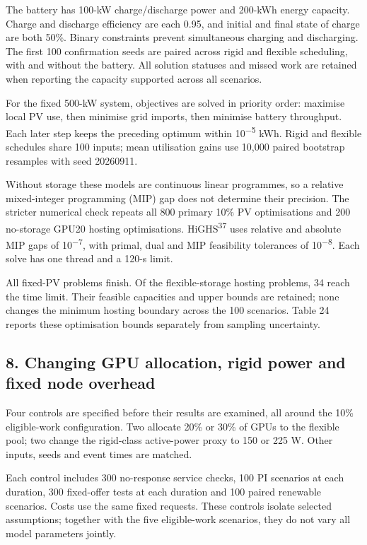 \documentclass[10pt,a4paper]{article}
\begin{document}
The battery has 100-kW charge/discharge power and 200-kWh energy capacity. Charge and discharge efficiency are each 0.95, and initial and final state of charge are both 50\%. Binary constraints prevent simultaneous charging and discharging. The first 100 confirmation seeds are paired across rigid and flexible scheduling, with and without the battery. All solution statuses and missed work are retained when reporting the capacity supported across all scenarios.


For the fixed 500-kW system, objectives are solved in priority order: maximise local PV use, then minimise grid imports, then minimise battery throughput. Each later step keeps the preceding optimum within 10\textsuperscript{−5} kWh. Rigid and flexible schedules share 100 inputs; mean utilisation gains use 10,000 paired bootstrap resamples with seed 20260911.


Without storage these models are continuous linear programmes, so a relative mixed-integer programming (MIP) gap does not determine their precision. The stricter numerical check repeats all 800 primary 10\% PV optimisations and 200 no-storage GPU20 hosting optimisations. HiGHS\textsuperscript{37} uses relative and absolute MIP gaps of 10\textsuperscript{−7}, with primal, dual and MIP feasibility tolerances of 10\textsuperscript{−8}. Each solve has one thread and a 120-s limit.


All fixed-PV problems finish. Of the flexible-storage hosting problems, 34 reach the time limit. Their feasible capacities and upper bounds are retained; none changes the minimum hosting boundary across the 100 scenarios. Table 24 reports these optimisation bounds separately from sampling uncertainty.


\subsection{8. Changing GPU allocation, rigid power and fixed node overhead}

Four controls are specified before their results are examined, all around the 10\% eligible-work configuration. Two allocate 20\% or 30\% of GPUs to the flexible pool; two change the rigid-class active-power proxy to 150 or 225 W. Other inputs, seeds and event times are matched.


Each control includes 300 no-response service checks, 100 PI scenarios at each duration, 300 fixed-offer tests at each duration and 100 paired renewable scenarios. Costs use the same fixed requests. These controls isolate selected assumptions; together with the five eligible-work scenarios, they do not vary all model parameters jointly.
\end{document}

